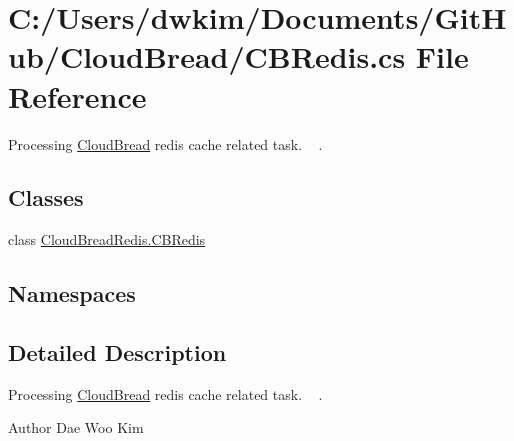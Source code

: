 \hypertarget{a00118}{}\section{C\+:/\+Users/dwkim/\+Documents/\+Git\+Hub/\+Cloud\+Bread/\+C\+B\+Redis.cs File Reference}
\label{a00118}


Processing \hyperlink{a00217}{Cloud\+Bread} redis cache related task. ~\newline
.  


\subsection*{Classes}
\begin{DoxyCompactItemize}
\item 
class \hyperlink{a00030}{Cloud\+Bread\+Redis.\+C\+B\+Redis}
\end{DoxyCompactItemize}
\subsection*{Namespaces}
\begin{DoxyCompactItemize}
\end{DoxyCompactItemize}


\subsection{Detailed Description}
Processing \hyperlink{a00217}{Cloud\+Bread} redis cache related task. ~\newline
. 

\begin{DoxyAuthor}{Author}
Dae Woo Kim 
\end{DoxyAuthor}
